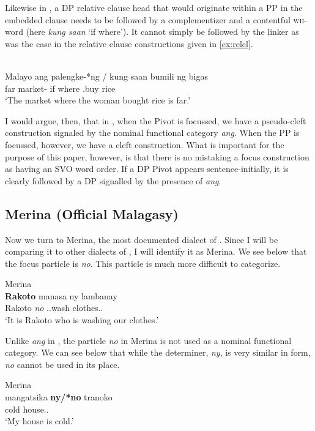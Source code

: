 \documentclass[output=paper]{langsci/langscibook}
\begin{document}
Likewise in , a DP relative clause head that would originate within a PP
in the embedded clause needs to be followed by a complementizer and a
contentful \textsc{wh}-word (here \emph{kung saan} `if where').  It cannot
simply be followed by the linker as was the case in the relative clause
constructions given in \eqref{ex:relcl}.

\ea {}\\
    \gll Malayo ang palengke-*ng / kung saan bumili ng bigas\\
    far \Nom{} market-\Lnk{} {} if where \At.buy  \Acc{} rice\\
    \glt `The market where the woman bought rice is far.'
\z

I would argue, then, that in , when the Pivot is focussed, we have
a pseudo-cleft construction signaled by the nominal functional category
\emph{ang}. When the PP is focussed, however, we have a cleft construction.
What is important for the purpose of this paper, however, is that there is no
mistaking a focus construction as having an SVO word order.  If a DP
Pivot appears sentence-initially, it is clearly followed by a DP signalled by
the presence of \emph{ang}.

\subsection{Merina (Official Malagasy)}

Now we turn to Merina, the most documented dialect of .  Since I will
be comparing it to other dialects of , I will identify it as Merina.
We see below that the focus particle is \emph{no}.  This particle is much more
difficult to categorize.

\ea Merina\\
	\gll  \textbf{Rakoto}  manasa ny lambanay\\
    Rakoto \emph{no} \Prs.\At{}.wash \Det{} clothes.\Fpl.\Excl{}\\
    \glt `It is Rakoto who is washing our clothes.'
\z

Unlike \emph{ang} in , the particle \emph{no} in Merina is not
used as a nominal functional category.  We can see below that while the
determiner, \emph{ny}, is very similar in form, \emph{no} cannot be used in its
place.

\ea Merina\\
    \gll mangatsika \textbf{ny/*no} tranoko\\
    cold \Det{} house.\Fsg.\Gen{}\\
    \glt `My house is cold.'
\z
\end{document}
